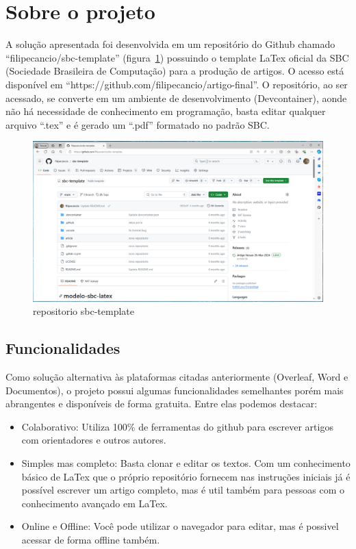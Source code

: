 \section{Sobre o projeto}

A solução apresentada foi desenvolvida em um repositório do Github chamado ``filipecancio/sbc-template'' (figura~\ref{fig:fig10}) possuindo o template LaTex oficial da SBC (Sociedade Brasileira de Computação) para a produção de artigos. O acesso está disponível em ``https://github.com/filipecancio/artigo-final''. O repositório, ao ser acessado, se converte em um ambiente de desenvolvimento (Devcontainer), aonde não há necessidade de conhecimento em programação, basta editar qualquer arquivo ``.tex'' e é gerado um ``.pdf'' formatado no padrão SBC.

\begin{figure}[ht]
	\centering
	\includegraphics[width=.7\textwidth]{./images/fig10.png}
	\caption{repositorio sbc-template}
	\label{fig:fig10}
\end{figure}

\subsection{Funcionalidades}

Como solução alternativa às plataformas citadas anteriormente (Overleaf, Word e Documentos), o projeto possui algumas funcionalidades semelhantes porém mais abrangentes e disponíveis de forma gratuita. Entre elas podemos destacar:

\begin{itemize}
	\item Colaborativo: Utiliza 100\% de ferramentas do github para escrever artigos com orientadores e outros autores.
	\item Simples mas completo: Basta clonar e editar os textos. Com um conhecimento básico de LaTex que o próprio repositório fornecem nas instruções iniciais já é possível escrever um artigo completo, mas é util também para pessoas com o conhecimento avançado em LaTex.
	\item Online e Offline: Você pode utilizar o navegador para editar, mas é possivel acessar de forma offline também.
\end{itemize}



